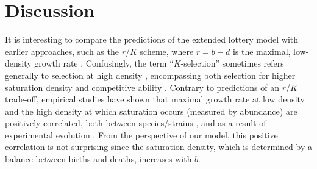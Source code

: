 \documentclass[11pt]{article}
\begin{document}
\section*{Discussion}

It is interesting to compare the predictions of the extended lottery model with earlier approaches, such as the $r$/$K$ scheme, where $r=b-d$ is the maximal, low-density growth rate \citep{pianka_1972}. Confusingly, the term ``$K$-selection'' sometimes refers generally to selection at high density \citep{pianka_1972}, encompassing both selection for higher saturation density \citep{macarthur_1967} and competitive ability \citep{gill_1974}. Contrary to predictions of an $r$/$K$ trade-off, empirical studies have shown that maximal growth rate at low density and the high density at which saturation occurs (measured by abundance) are positively correlated, both between species/strains \citep{luckinbill_1979,kuno_1991,hendriks_2005,fitzsimmons_2010}, and as a result of experimental evolution \citep{luckinbill_1978,luckinbill_1979}. From the perspective of our model, this positive correlation is not surprising since the saturation density, which is determined by a balance between births and deaths, increases with $b$. 

\end{document}
